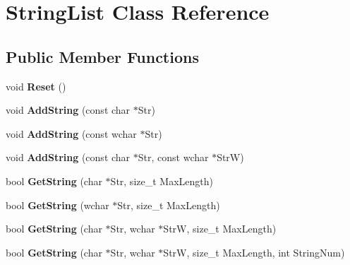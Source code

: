 \hypertarget{class_string_list}{\section{String\-List Class Reference}
\label{class_string_list}
}
\subsection*{Public Member Functions}
\begin{DoxyCompactItemize}
\item 
\hypertarget{class_string_list_ae2a1e5a54ac6f920f05dc154b0bee611}{void {\bfseries Reset} ()}\label{class_string_list_ae2a1e5a54ac6f920f05dc154b0bee611}

\item 
\hypertarget{class_string_list_aaf00b2e6b7e8d8b6ac2df5ad90046a59}{void {\bfseries Add\-String} (const char $\ast$Str)}\label{class_string_list_aaf00b2e6b7e8d8b6ac2df5ad90046a59}

\item 
\hypertarget{class_string_list_a70962c7f2a69debd1b338110690628e2}{void {\bfseries Add\-String} (const wchar $\ast$Str)}\label{class_string_list_a70962c7f2a69debd1b338110690628e2}

\item 
\hypertarget{class_string_list_a15ede35fd74110f4cb6a0f023542c87a}{void {\bfseries Add\-String} (const char $\ast$Str, const wchar $\ast$Str\-W)}\label{class_string_list_a15ede35fd74110f4cb6a0f023542c87a}

\item 
\hypertarget{class_string_list_a9a24c36805a70615159663bbdc9de118}{bool {\bfseries Get\-String} (char $\ast$Str, size\-\_\-t Max\-Length)}\label{class_string_list_a9a24c36805a70615159663bbdc9de118}

\item 
\hypertarget{class_string_list_a21e569f644867c3943ab4b77c70e5e89}{bool {\bfseries Get\-String} (wchar $\ast$Str, size\-\_\-t Max\-Length)}\label{class_string_list_a21e569f644867c3943ab4b77c70e5e89}

\item 
\hypertarget{class_string_list_a1f71bf3075b90299810a04d3ba036236}{bool {\bfseries Get\-String} (char $\ast$Str, wchar $\ast$Str\-W, size\-\_\-t Max\-Length)}\label{class_string_list_a1f71bf3075b90299810a04d3ba036236}

\item 
\hypertarget{class_string_list_a10d8427780e2c0829958bb470f669190}{bool {\bfseries Get\-String} (char $\ast$Str, wchar $\ast$Str\-W, size\-\_\-t Max\-Length, int String\-Num)}\label{class_string_list_a10d8427780e2c0829958bb470f669190}


\end{DoxyCompactItemize}
